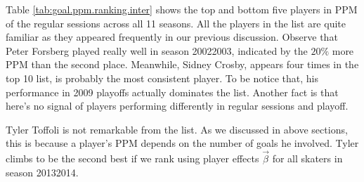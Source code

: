Table \ref{tab:goal.ppm.ranking.inter} shows the top and bottom five players in PPM of the regular sessions across all 11 seasons. All the players in the list are quite familiar as they appeared frequently in our previous discussion. Observe that Peter Forsberg played really well in season 20022003, indicated by the $20\%$ more PPM than the second place. Meanwhile, Sidney Crosby, appears four times in the top 10 list, is probably the most consistent player. To be notice that, his performance in 2009 playoffs actually dominates the list. Another fact is that here's no signal of players performing differently in regular sessions and playoff. 

Tyler Toffoli is not remarkable from the list. As we discussed in above sections, this is because a player's PPM depends on the number of goals he involved. Tyler climbs to be the second best if we rank using player effects $\vec{\beta}$ for all skaters in season 20132014.


